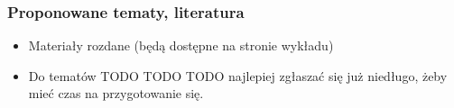 \documentclass{beamer}
\begin{document}
\begin{frame}

\frametitle{Proponowane tematy, literatura}

\begin{itemize}

\item Materiały rozdane (będą dostępne na stronie wykładu) \pause
\item Do tematów TODO TODO TODO najlepiej zgłaszać się już niedługo, 
żeby mieć czas na przygotowanie się.

\end{itemize}

\end{frame}






\end{document}
